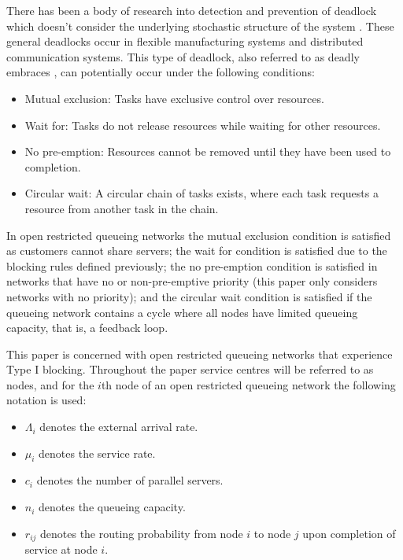 \documentclass{article}
\numberwithin{equation}{section}
\begin{document}
There has been a body of research into detection and prevention of deadlock which doesn't consider the underlying stochastic structure of the system \cite{coffmanelphick71, reveliotis15a, reveliotis15b}.
These general deadlocks occur in flexible manufacturing systems and distributed communication systems.
This type of deadlock, also referred to as deadly embraces \cite{coffmanelphick71}, can potentially occur under the following conditions:
\begin{itemize}
  \item Mutual exclusion: Tasks have exclusive control over resources.
  \item Wait for: Tasks do not release resources while waiting for other resources.
  \item No pre-emption: Resources cannot be removed until they have been used to completion.
  \item Circular wait: A circular chain of tasks exists, where each task requests a resource from another task in the chain.
\end{itemize}

In open restricted queueing networks the mutual exclusion condition is satisfied as customers cannot share servers; the wait for condition is satisfied due to the blocking rules defined previously; the no pre-emption condition is satisfied in networks that have no or non-pre-emptive priority (this paper only considers networks with no priority); and the circular wait condition is satisfied if the queueing network contains a cycle where all nodes have limited queueing capacity, that is, a feedback loop.

This paper is concerned with open restricted queueing networks that experience Type I blocking.
Throughout the paper service centres will be referred to as nodes, and for the $i$th node of an open restricted queueing network the following notation is used:

\begin{itemize}
  \item $\Lambda_i$ denotes the external arrival rate.
  \item $\mu_i$ denotes the service rate.
  \item $c_i$ denotes the number of parallel servers.
  \item $n_i$ denotes the queueing capacity.
  \item $r_{ij}$ denotes the routing probability from node $i$ to node $j$ upon completion of service at node $i$.
\end{itemize}
\end{document}
